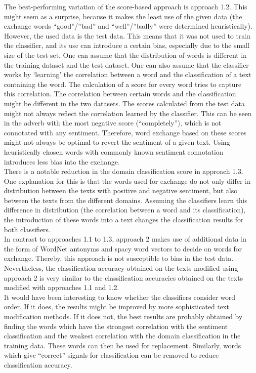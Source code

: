 \documentclass[11pt,a4paper]{article}
\begin{document}
The best-performing variation of the score-based approach is approach 1.2. This might seem as a surprise, because it makes the least use of the given data (the exchange words “good”/”bad” and “well”/”badly” were determined heuristically). However, the used data is the test data. This means that it was not used to train the classifier, and its use can introduce a certain bias, especially due to the small size of the test set. One can assume that the distribution of words is different in the training dataset and the test dataset. One can also assume that the classifier works by ‘learning’ the correlation between a word and the classification of a text containing the word. The calculation of a score for every word tries to capture this correlation. The correlation between certain words and the classification might be different in the two datasets. The scores calculated from the test data might not always reflect the correlation learned by the classifier. This can be seen in the adverb with the most negative score (“completely”), which is not connotated with any sentiment. Therefore, word exchange based on these scores might not always be optimal to revert the sentiment of a given text. Using heuristically chosen words with commonly known sentiment connotation introduces less bias into the exchange.\\
There is a notable reduction in the domain classification score in approach 1.3. One explanation for this is that the words used for exchange do not only differ in distribution between the texts with positive and negative sentiment, but also between the texts from the different domains. Assuming the classifiers learn this difference in distribution (the correlation between a word and its classification), the introduction of these words into a text changes the classification results for both classifiers.\\
In contrast to approaches 1.1 to 1.3, approach 2 makes use of additional data in the form of WordNet antonyms and spacy word vectors to decide on words for exchange. Thereby, this approach is not susceptible to bias in the test data. Nevertheless, the classification accuracy obtained on the texts modified using approach 2 is very similar to the classification accuracies obtained on the texts modified with approaches 1.1 and 1.2. \\
It would have been interesting to know whether the classifiers consider word order. If it does, the results might be improved by more sophisticated text modification methods. If it does not, the best results are probably obtained by finding the words which have the strongest correlation with the sentiment classification and the weakest correlation with the domain classification in the training data. These words can then be used for replacement. Similarly, words which give “correct” signals for classification can be removed to reduce classification accuracy.\\
\end{document}
